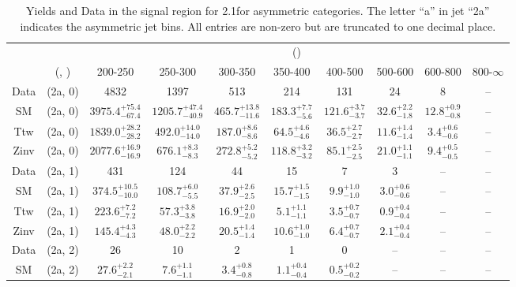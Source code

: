 \begin{table}[h!]
\tiny
\centering
\caption{Yields and Data in the signal region for 2.1\ifb for asymmetric categories. The letter ``a'' in jet \eg ``2a''  indicates the asymmetric jet bins. All entries are non-zero but are truncated to one decimal place.\label{tab:yieldsall_sig_comb_asym}}
\begin{tabular}
{cccccccccc}
	\hline\hline
	&	& \multicolumn{8}{c}{\scalht (\gev)}\\ 
	&	 (\njet, \nb) & 200-250 & 250-300 & 300-350 & 350-400 & 400-500 & 500-600 & 600-800 & 800-$\infty$ \\ [0.8ex] 
\hline
	Data & (2a, 0) & 4832 & 1397 & 513 & 214 & 131 & 24 & 8 & -- \\[0.5ex] 
	SM & (2a, 0) & $3975.4^{+ 75.4 }_{- 67.4 }$ & $1205.7^{+ 47.4 }_{- 40.9 }$ & $465.7^{+ 13.8 }_{- 11.6 }$ & $183.3^{+ 7.7 }_{- 5.6 }$ & $121.6^{+ 3.7 }_{- 3.7 }$ & $32.6^{+ 2.2 }_{- 1.8 }$ & $12.8^{+ 0.9 }_{- 0.8 }$ & -- \\[0.5ex] 
	Ttw & (2a, 0) & $1839.0^{+ 28.2 }_{- 28.2 }$ & $492.0^{+ 14.0 }_{- 14.0 }$ & $187.0^{+ 8.6 }_{- 8.6 }$ & $64.5^{+ 4.6 }_{- 4.6 }$ & $36.5^{+ 2.7 }_{- 2.7 }$ & $11.6^{+ 1.4 }_{- 1.4 }$ & $3.4^{+ 0.6 }_{- 0.6 }$ & -- \\[0.5ex] 
	Zinv & (2a, 0) & $2077.6^{+ 16.9 }_{- 16.9 }$ & $676.1^{+ 8.3 }_{- 8.3 }$ & $272.8^{+ 5.2 }_{- 5.2 }$ & $118.8^{+ 3.2 }_{- 3.2 }$ & $85.1^{+ 2.5 }_{- 2.5 }$ & $21.0^{+ 1.1 }_{- 1.1 }$ & $9.4^{+ 0.5 }_{- 0.5 }$ & -- \\[0.5ex] 
	Data & (2a, 1) & 431 & 124 & 44 & 15 & 7 & 3 & -- & -- \\[0.5ex] 
	SM & (2a, 1) & $374.5^{+ 10.5 }_{- 10.0 }$ & $108.7^{+ 6.0 }_{- 5.5 }$ & $37.9^{+ 2.6 }_{- 2.5 }$ & $15.7^{+ 1.5 }_{- 1.5 }$ & $9.9^{+ 1.0 }_{- 1.0 }$ & $3.0^{+ 0.6 }_{- 0.6 }$ & -- & -- \\[0.5ex] 
	Ttw & (2a, 1) & $223.6^{+ 7.2 }_{- 7.2 }$ & $57.3^{+ 3.8 }_{- 3.8 }$ & $16.9^{+ 2.0 }_{- 2.0 }$ & $5.1^{+ 1.1 }_{- 1.1 }$ & $3.5^{+ 0.7 }_{- 0.7 }$ & $0.9^{+ 0.4 }_{- 0.4 }$ & -- & -- \\[0.5ex] 
	Zinv & (2a, 1) & $145.4^{+ 4.3 }_{- 4.3 }$ & $48.0^{+ 2.2 }_{- 2.2 }$ & $20.5^{+ 1.4 }_{- 1.4 }$ & $10.6^{+ 1.0 }_{- 1.0 }$ & $6.4^{+ 0.7 }_{- 0.7 }$ & $2.1^{+ 0.4 }_{- 0.4 }$ & -- & -- \\[0.5ex] 
	Data & (2a, 2) & 26 & 10 & 2 & 1 & 0 & -- & -- & -- \\[0.5ex] 
	SM & (2a, 2) & $27.6^{+ 2.2 }_{- 2.1 }$ & $7.6^{+ 1.1 }_{- 1.1 }$ & $3.4^{+ 0.8 }_{- 0.8 }$ & $1.1^{+ 0.4 }_{- 0.4 }$ & $0.5^{+ 0.2 }_{- 0.2 }$ & -- & -- & -- \\[0.5ex] 

\end{tabular}
\end{table}
